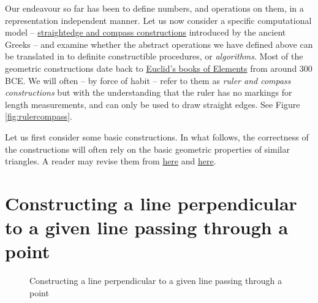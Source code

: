 Our endeavour so far has been to define numbers, and operations on them, in a representation independent manner. Let us now consider a specific computational model -- \href{https://en.wikipedia.org/wiki/Straightedge\_and\_compass\_construction}{straightedge and compass constructions} introduced by the ancient Greeks -- and examine whether the abstract operations we have defined above can be translated in to definite constructible procedures, or {\em algorithms}. Most of the geometric constructions  date back to  \href{https://en.wikipedia.org/wiki/Euclid\%27s\_Elements}{Euclid's books of Elements} from around 300 BCE. We will often -- by force of habit -- refer to them as {\em ruler and compass constructions} but with the understanding that the ruler has no markings for length measurements, and can only be used to draw straight edges. See Figure \ref{fig:rulercompass}. 

Let us first consider some basic constructions. In what follows, the correctness of the constructions will often rely on the basic geometric properties of similar triangles. A reader may revise them from \href{https://en.wikipedia.org/wiki/Triangle}{here} and \href{https://en.wikipedia.org/wiki/Similarity\_(geometry)}{here}.

\section{Constructing a line perpendicular to a given line  passing through a point}
\label{sec:perp}
\begin{figure}
\begin{center}
\end{center}
\caption{Constructing a line perpendicular to a given line  passing through a point}
\label{fig:perp}
\end{figure}

